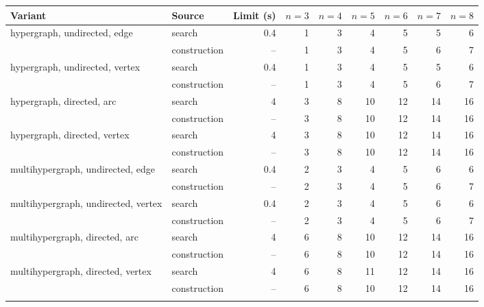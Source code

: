 \begin{tabular}{llrrrrrrr}
\toprule
Variant & Source & Limit (s) & $n=3$ & $n=4$ & $n=5$ & $n=6$ & $n=7$ & $n=8$ \\
\midrule
hypergraph, undirected, edge & search & 0.4 & 1 & 3 & 4 & 5 & 5 & 6 \\
 & construction & -- & 1 & 3 & 4 & 5 & 6 & 7 \\
\addlinespace[2pt]
hypergraph, undirected, vertex & search & 0.4 & 1 & 3 & 4 & 5 & 5 & 6 \\
 & construction & -- & 1 & 3 & 4 & 5 & 6 & 7 \\
\addlinespace[2pt]
hypergraph, directed, arc & search & 4 & 3 & 8 & 10 & 12 & 14 & 16 \\
 & construction & -- & 3 & 8 & 10 & 12 & 14 & 16 \\
\addlinespace[2pt]
hypergraph, directed, vertex & search & 4 & 3 & 8 & 10 & 12 & 14 & 16 \\
 & construction & -- & 3 & 8 & 10 & 12 & 14 & 16 \\
\addlinespace[2pt]
multihypergraph, undirected, edge & search & 0.4 & 2 & 3 & 4 & 5 & 6 & 6 \\
 & construction & -- & 2 & 3 & 4 & 5 & 6 & 7 \\
\addlinespace[2pt]
multihypergraph, undirected, vertex & search & 0.4 & 2 & 3 & 4 & 5 & 6 & 6 \\
 & construction & -- & 2 & 3 & 4 & 5 & 6 & 7 \\
\addlinespace[2pt]
multihypergraph, directed, arc & search & 4 & 6 & 8 & 10 & 12 & 14 & 16 \\
 & construction & -- & 6 & 8 & 10 & 12 & 14 & 16 \\
\addlinespace[2pt]
multihypergraph, directed, vertex & search & 4 & 6 & 8 & 11 & 12 & 14 & 16 \\
 & construction & -- & 6 & 8 & 10 & 12 & 14 & 16 \\
\addlinespace[2pt]
\bottomrule
\end{tabular}
